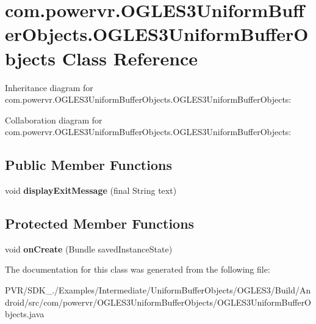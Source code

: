 \hypertarget{classcom_1_1powervr_1_1_o_g_l_e_s3_uniform_buffer_objects_1_1_o_g_l_e_s3_uniform_buffer_objects}{\section{com.\+powervr.\+O\+G\+L\+E\+S3\+Uniform\+Buffer\+Objects.\+O\+G\+L\+E\+S3\+Uniform\+Buffer\+Objects Class Reference}
\label{classcom_1_1powervr_1_1_o_g_l_e_s3_uniform_buffer_objects_1_1_o_g_l_e_s3_uniform_buffer_objects}
}


Inheritance diagram for com.\+powervr.\+O\+G\+L\+E\+S3\+Uniform\+Buffer\+Objects.\+O\+G\+L\+E\+S3\+Uniform\+Buffer\+Objects\+:


Collaboration diagram for com.\+powervr.\+O\+G\+L\+E\+S3\+Uniform\+Buffer\+Objects.\+O\+G\+L\+E\+S3\+Uniform\+Buffer\+Objects\+:
\subsection*{Public Member Functions}
\begin{DoxyCompactItemize}
\item 
\hypertarget{classcom_1_1powervr_1_1_o_g_l_e_s3_uniform_buffer_objects_1_1_o_g_l_e_s3_uniform_buffer_objects_a7e2331cbb4a37747f12e214e35a3c77c}{void {\bfseries display\+Exit\+Message} (final String text)}\label{classcom_1_1powervr_1_1_o_g_l_e_s3_uniform_buffer_objects_1_1_o_g_l_e_s3_uniform_buffer_objects_a7e2331cbb4a37747f12e214e35a3c77c}

\end{DoxyCompactItemize}
\subsection*{Protected Member Functions}
\begin{DoxyCompactItemize}
\item 
\hypertarget{classcom_1_1powervr_1_1_o_g_l_e_s3_uniform_buffer_objects_1_1_o_g_l_e_s3_uniform_buffer_objects_a07dd5f56c8d9ccbd3d00051069a6f2ca}{void {\bfseries on\+Create} (Bundle saved\+Instance\+State)}\label{classcom_1_1powervr_1_1_o_g_l_e_s3_uniform_buffer_objects_1_1_o_g_l_e_s3_uniform_buffer_objects_a07dd5f56c8d9ccbd3d00051069a6f2ca}

\end{DoxyCompactItemize}


The documentation for this class was generated from the following file\+:\begin{DoxyCompactItemize}
\item 
P\+V\+R/\+S\+D\+K\+\_./\+Examples/\+Intermediate/\+Uniform\+Buffer\+Objects/\+O\+G\+L\+E\+S3/\+Build/\+Android/src/com/powervr/\+O\+G\+L\+E\+S3\+Uniform\+Buffer\+Objects/O\+G\+L\+E\+S3\+Uniform\+Buffer\+Objects.\+java\end{DoxyCompactItemize}

